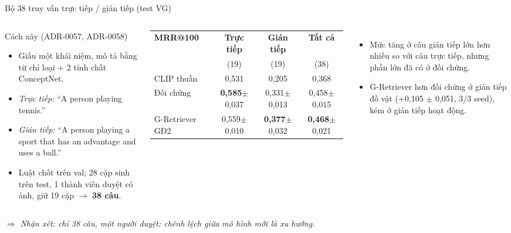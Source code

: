 \documentclass[10pt, aspectratio=169]{beamer}
\makeatletter
\newcommand{\nhanxet}[1]{\par\smallskip$\Rightarrow$ \textit{Nhận xét: #1}}
\newcommand{\mrr}{MRR@100}
\newcommand{\pmm}{\ensuremath{\pm}}
\makeatother
\begin{document}
\begin{frame}{Bộ 38 truy vấn trực tiếp / gián tiếp (test VG)}
  \begin{columns}[T]
      \begin{block}{Cách xây (ADR-0057, ADR-0058)}
        \small
        \begin{itemize}
          \item Giấu một khái niệm, mô tả bằng từ chỉ loại + 2 tính chất ConceptNet.
          \item \textit{Trực tiếp:} ``A person playing tennis.''
          \item \textit{Gián tiếp:} ``A person playing a sport that has an advantage and uses a ball.''
          \item Luật chốt trên val; 28 cặp sinh trên test, 1 thành viên duyệt có ảnh, giữ 19 cặp $\to$ \textbf{38 câu}.
        \end{itemize}
      \end{block}
      \centering\scriptsize
      \begin{tabular}{l c c c}
        \toprule
        \textbf{\mrr} & \textbf{Trực tiếp} & \textbf{Gián tiếp} & \textbf{Tất cả} \\
         & (19) & (19) & (38) \\
        \midrule
        CLIP thuần & 0,531 & 0,205 & 0,368 \\
        Đối chứng & \textbf{0,585}\pmm0,037 & 0,331\pmm0,013 & 0,458\pmm0,015 \\
        G-Retriever GĐ2 & 0,559\pmm0,010 & \textbf{0,377}\pmm0,032 & \textbf{0,468}\pmm0,021 \\
        \bottomrule
      \end{tabular}
      \par{}
      \par\medskip\raggedright\small
      \begin{itemize}
        \item Mức tăng ở câu gián tiếp lớn hơn nhiều so với câu trực tiếp, nhưng phần lớn đã có ở đối chứng.
        \item G-Retriever hơn đối chứng ở gián tiếp đồ vật (+0,105 \pmm{} 0,051, 3/3 seed), kém ở gián tiếp hoạt động.
      \end{itemize}
  \end{columns}
  \nhanxet{chỉ 38 câu, một người duyệt: chênh lệch giữa mô hình mới là xu hướng.}
\end{frame}
\end{document}
